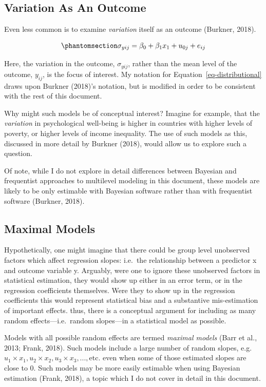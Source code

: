 \documentclass[
  letterpaper,
  DIV=11,
  numbers=noendperiod]{scrreprt}
\begin{document}
\subsection{Variation As An Outcome}\label{variation-as-an-outcome}

Even less common is to examine \emph{variation} itself as an outcome
(Burkner, 2018).

\begin{equation}\phantomsection\label{eq-distributional}{\sigma_{yij} = \beta_0 + \beta_1 x_1 + u_{0j} + e_{ij}}\end{equation}

Here, the variation in the outcome, \(\sigma_{yij}\), rather than the
mean level of the outcome, \(y_{ij}\), is the focus of interest. My
notation for Equation~\ref{eq-distributional} draws upon Burkner
(2018)'s notation, but is modified in order to be consistent with the
rest of this document.

Why might such models be of conceptual interest? Imagine for example,
that the \emph{variation} in psychological well-being is higher in
countries with higher levels of poverty, or higher levels of income
inequality. The use of such models as this, discussed in more detail by
Burkner (2018), would allow us to explore such a question.

Of note, while I do not explore in detail differences between Bayesian
and frequentist approaches to multilevel modeling in this document,
these models are likely to be only estimable with Bayesian software
rather than with frequentist software (Burkner, 2018).

\subsection{Maximal Models}\label{maximal-models}

Hypothetically, one might imagine that there could be group level
unobserved factors which affect regression slopes: i.e.~the relationship
between a predictor x and outcome variable y. Arguably, were one to
ignore these unobserved factors in statistical estimation, they would
show up either in an error term, or in the regression coefficients
themselves. Were they to show up in the regression coefficients this
would represent statistical bias and a substantive mis-estimation of
important effects. thus, there is a conceptual argument for including as
many random effects---i.e.~random slopes---in a statistical model as
possible.

Models with all possible random effects are termed \emph{maximal models}
(Barr et al., 2013; Frank, 2018). Such models include a large number of
random slopes,
e.g.~\(u_1 \times x_1, u_2 \times x_2, u_3 \times x_3, ..., \text{etc.}\)
even when some of those estimated slopes are close to 0. Such models may
be more easily estimable when using Bayesian estimation (Frank, 2018), a
topic which I do not cover in detail in this document.
\end{document}
